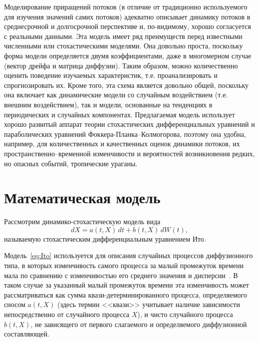 Моделирование приращений потоков (в отличие от традиционно используемого для изучения значений самих потоков) адекватно описывает динамику потоков в среднесрочной и долгосрочной перспективе и, по-видимому, хорошо согласуется с реальными данными. Эта модель имеет ряд преимуществ перед известными численными или стохастическими моделями. Она довольно проста, поскольку форма модели определяется двумя коэффициентами, даже в многомерном случае (вектор дрейфа и матрица диффузии). Таким образом, можно количественно оценить поведение изучаемых характеристик, т.е. проанализировать и спрогнозировать их. Кроме того, эта схема является довольно общей, поскольку она включает как динамические модели со случайным воздействием (т.е. внешним воздействием), так и модели, основанные на тенденциях в периодических и случайных компонентах. Предлагаемая модель использует хорошо развитый аппарат теории стохастических дифференциальных уравнений и параболических уравнений Фоккера-Планка–Колмогорова, поэтому она удобна, например, для количественных и качественных оценок динамики потоков, их пространственно–временной изменчивости и вероятностей возникновения редких, но опасных событий, тропические ураганы.


\section{Математическая модель}
\label{sec:Model}

Рассмотрим динамико-стохастическую модель вида
\begin{equation}
	\label{eq:Ito}
	dX = a(t,X)\,dt + b(t, X)\,dW(t), 
\end{equation}
называемую стохастическим дифференциальным уравнением Ито.

Модель~\eqref{eq:Ito} используется для описания случайных процессов диффузионного типа, в которых изменчивость самого процесса за малый промежуток времени мала по сравнению с изменчивостью его среднего значения и дисперсии~\cite{jin2020controls,van2021characterisation}. В таком случае за указанный малый промежуток времени эта изменчивость может рассматриваться как сумма квази-детерминированного процесса, определяемого сносом $a(t, X)$ (здесь термин <<квази>> учитывает наличие зависимости непосредственно от случайного процесса $X$), и чисто случайного процесса $b(t, X)$, не зависящего от первого слагаемого и определяемого диффузионной составляющей.

